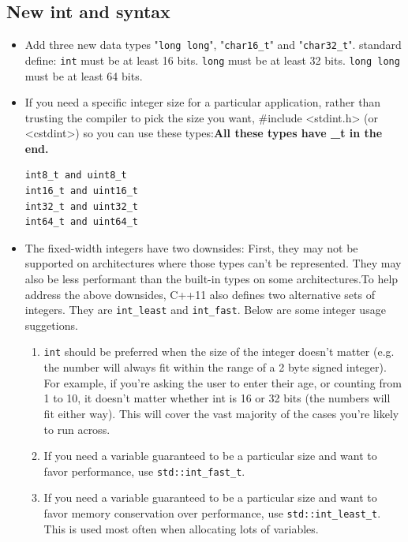 \documentclass[a4paper,11pt,twoside]{book}
\begin{document}
\subsection{New int and syntax}
\begin{itemize}

    \item Add three new data types "\texttt{long long}", "\texttt{char16\_t}"  and "\texttt{char32\_t}". standard define: \texttt{int} must be at least 16 bits.  \texttt{long} must be at least 32 bits.  \texttt{long long} must be at least 64 bits.

    \item If you need a specific integer size for a particular application, rather than trusting the compiler to pick the size you want, \#include <stdint.h> (or <cstdint>) so you can use these types:\textbf{All these types have \_t in the end.}
\begin{lstlisting}[numbers=none]
int8_t and uint8_t
int16_t and uint16_t
int32_t and uint32_t
int64_t and uint64_t
\end{lstlisting}

    \item The fixed-width integers have two downsides: First, they may not be supported on architectures where those types can't be represented. They may also be less performant than the built-in types on some architectures.To help address the above downsides, C++11 also defines two alternative sets of integers. They are \texttt{int\_least} and \texttt{int\_fast}. Below are some integer usage suggetions. 

\begin{enumerate}
	\item \texttt{int} should be preferred when the size of the integer doesn't matter (e.g. the number will always fit within the range of a 2 byte signed integer). For example, if you're asking the user to enter their age, or counting from 1 to 10, it doesn't matter whether int is 16 or 32 bits (the numbers will fit either way). This will cover the vast majority of the cases you're likely to run across.
	
	\item If you need a variable guaranteed to be a particular size and want to favor performance, use \texttt{std::int\_fast\_t}.
	
	\item If you need a variable guaranteed to be a particular size and want to favor memory conservation over performance, use \texttt{std::int\_least\_t}. This is used most often when allocating lots of variables.
	

\end{enumerate}
\end{itemize}
\end{document}
